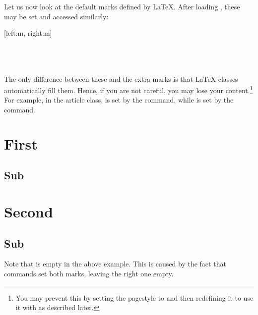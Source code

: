 Let us now look at the default marks defined by \LaTeX{}. After loading
, these may be set and accessed similarly:
\begin{lscommand}
  [left:m, right:m] \\
   \\
   \\
   \\
\end{lscommand}
The only difference between these and the extra marks is that \LaTeX{} classes
automatically fill them. Hence, if you are not careful, you may lose your
content.\footnote{You may prevent this by setting the pagestyle to
 and then redefining it to use it with  as
described later.}
For example, in the article class,  is set by the 
command, while  is set by the  command.
\begin{example}[standalone, paperheight=5cm]
\geometry{includehead, includefoot, headsep=.5em, footskip=1em} %
\sloppy %
\usepackage{fancyhdr}%
\usepackage{extramarks}%
\pagestyle{fancy}%
\fancyhead[L]{\firstleftmark}
\fancyhead[R]{\lastleftmark}
\fancyfoot[L]{\firstrightmark}
\fancyfoot[R]{\lastrightmark}

\section{First}
\subsection{Sub}
\section{Second}
\subsection{Sub}
\end{example}
Note that  is empty in the above example. This is caused by
the fact that  commands set both marks, leaving the right one
empty.

